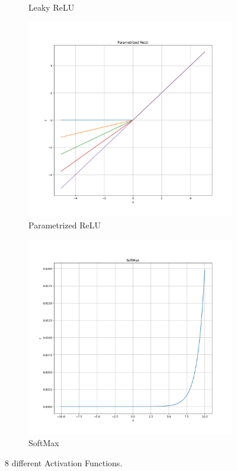 \begin{figure}
\begin{subfigure}{0.24\linewidth}
		\caption{Leaky ReLU}
	\end{subfigure}
	\begin{subfigure}{0.24\linewidth}
		\includegraphics[width=\linewidth]{figures/pararelu.png}
		\caption{Parametrized ReLU}
	\end{subfigure}
	\begin{subfigure}{0.24\linewidth}
		\includegraphics[width=\linewidth]{figures/softmax.png}
		\caption{SoftMax}
	\end{subfigure}
	\caption{8 different Activation Functions.}
	\label{fig:act}
\end{figure}
